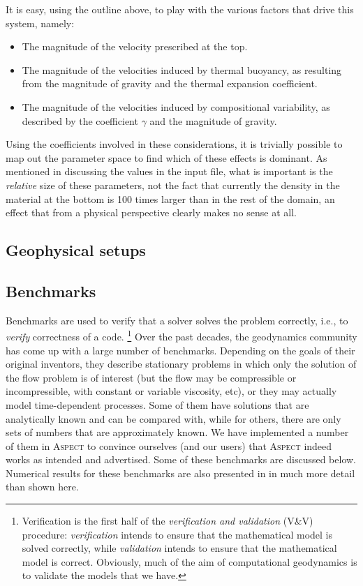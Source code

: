 \documentclass{article}
\newcommand{\aspect}{\textsc{Aspect}}
\begin{document}
It is easy, using the
outline above, to play with the various factors that drive this system, namely:
\begin{itemize}
  \item The magnitude of the velocity prescribed at the top.
  \item The magnitude of the velocities induced by thermal buoyancy, as
  resulting from the magnitude of gravity and the thermal expansion coefficient.
  \item The magnitude of the velocities induced by compositional variability, as
  described by the coefficient $\gamma$ and the magnitude of gravity.
\end{itemize}
Using the coefficients involved in these considerations, it is trivially
possible to map out the parameter space to find which of these effects is
dominant. As mentioned in discussing the values in the input file, what is
important is the \textit{relative} size of these parameters, not the fact
that currently the density in the material at the bottom is 100 times larger
than in the rest of the domain, an effect that from a physical perspective
clearly makes no sense at all.




\subsection{Geophysical setups}
\label{sec:cookbooks-geophysical}


\subsection{Benchmarks}
\label{sec:cookbooks-benchmarks}

Benchmarks are used to verify that a solver solves the problem correctly,
i.e., to \textit{verify} correctness of a code.%
\footnote{Verification is the first half of the \textit{verification and
    validation} (V\&V) procedure: \textit{verification} intends to ensure that the
  mathematical model is solved correctly, while \textit{validation} intends to
  ensure that the mathematical model is correct. Obviously, much of the aim of
  computational geodynamics is to validate the models that we have.}
Over the past decades, the geodynamics community has come up with a large
number of benchmarks. Depending on the goals of their original inventors, they
describe stationary problems in which only the solution of the flow problem is
of interest (but the flow may be compressible or incompressible, with constant
or variable viscosity, etc), or they may actually model time-dependent
processes. Some of them have solutions that are analytically known and can be
compared with, while for others, there are only sets of numbers that are
approximately known. We have implemented a number of them in \aspect{} to
convince ourselves (and our users) that \aspect{} indeed works as intended and
advertised. Some of these benchmarks are discussed below. Numerical results
for these benchmarks are also presented in \cite{KHB12} in much more detail
than shown here.
\end{document}
